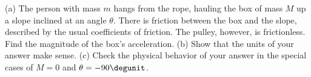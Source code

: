 (a) The person with mass $m$ hangs from the rope, hauling the box of mass $M$ up a slope inclined
at an angle $\theta$. There is friction between the box and the slope, described by
the usual coefficients of friction. The pulley, however, is frictionless.
Find the magnitude of the box's acceleration.\answercheck\hwendpart
%
(b) Show that the units of your answer make sense.\hwendpart
%
(c) Check the physical behavior of your answer in the special cases of
$M=0$ and $\theta=-90\degunit$.
